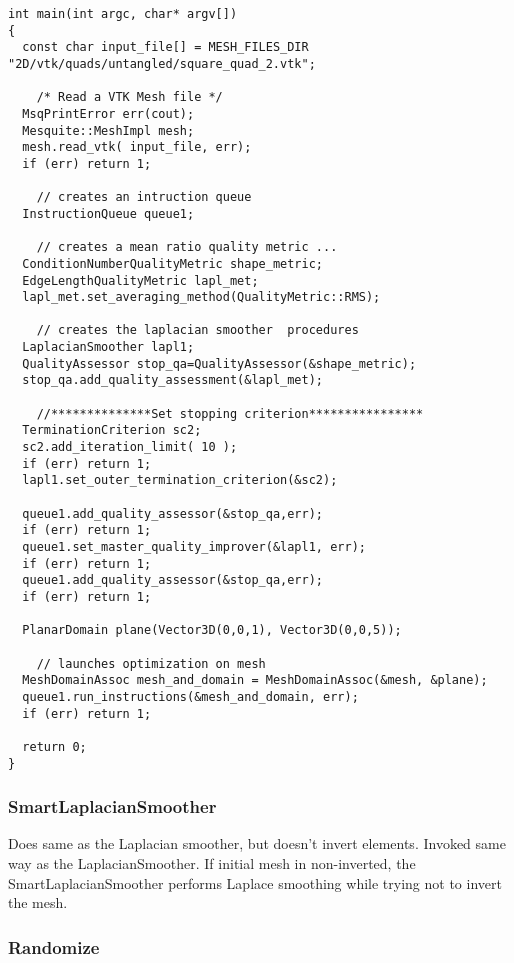 \begin{lstlisting}[frame=single]
int main(int argc, char* argv[])
{
  const char input_file[] = MESH_FILES_DIR "2D/vtk/quads/untangled/square_quad_2.vtk";

    /* Read a VTK Mesh file */
  MsqPrintError err(cout);
  Mesquite::MeshImpl mesh;
  mesh.read_vtk( input_file, err);
  if (err) return 1;
  
    // creates an intruction queue
  InstructionQueue queue1;
  
    // creates a mean ratio quality metric ...
  ConditionNumberQualityMetric shape_metric;
  EdgeLengthQualityMetric lapl_met;
  lapl_met.set_averaging_method(QualityMetric::RMS);
 
    // creates the laplacian smoother  procedures
  LaplacianSmoother lapl1;
  QualityAssessor stop_qa=QualityAssessor(&shape_metric);
  stop_qa.add_quality_assessment(&lapl_met);
  
    //**************Set stopping criterion****************
  TerminationCriterion sc2;
  sc2.add_iteration_limit( 10 );
  if (err) return 1;
  lapl1.set_outer_termination_criterion(&sc2);
  
  queue1.add_quality_assessor(&stop_qa,err); 
  if (err) return 1;
  queue1.set_master_quality_improver(&lapl1, err); 
  if (err) return 1;
  queue1.add_quality_assessor(&stop_qa,err); 
  if (err) return 1;
 
  PlanarDomain plane(Vector3D(0,0,1), Vector3D(0,0,5));
  
    // launches optimization on mesh
  MeshDomainAssoc mesh_and_domain = MeshDomainAssoc(&mesh, &plane);
  queue1.run_instructions(&mesh_and_domain, err); 
  if (err) return 1;

  return 0;
}
\end{lstlisting}

\subsubsection{SmartLaplacianSmoother}

Does same as the Laplacian smoother, but doesn't invert elements.  Invoked same way as the LaplacianSmoother.  If initial mesh in non-inverted, the SmartLaplacianSmoother performs Laplace smoothing while trying not to invert the mesh.

\subsubsection{Randomize}


